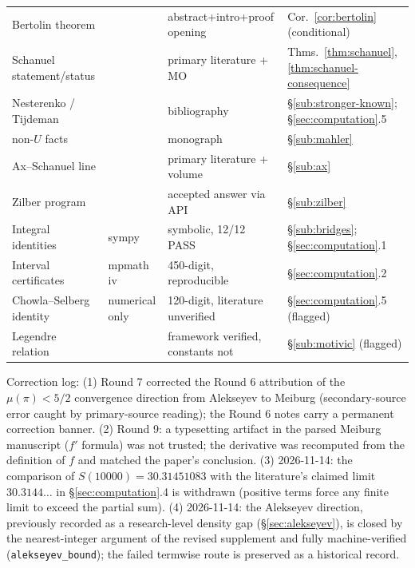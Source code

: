 \documentclass[11pt]{amsart}
\theoremstyle{definition}
\theoremstyle{remark}
\numberwithin{equation}{section}
\newcommand{\irr}{\mu}
\begin{document}
\begin{center}
\begin{tabularx}{\textwidth}{@{}p{}p{}p{}X@{}}
Bertolin theorem & \cite{Bertolin2026} & abstract+intro+proof opening & Cor.~\ref{cor:bertolin} (conditional) \\
Schanuel statement/status & \cite{Ax1971,Baker,MO33817} & primary literature + MO & Thms.~\ref{thm:schanuel},\ref{thm:schanuel-consequence} \\
Nesterenko / Tijdeman & \cite{Nesterenko1996,Tijdemann1971} & bibliography & \S\ref{sub:stronger-known}; \S\ref{sec:computation}.5 \\
non-$U$ facts & \cite{Baker} & monograph & \S\ref{sub:mahler} \\
Ax--Schanuel line & \cite{Ax1971,MPT2019,BakkerTsimerman2019,CambridgeFF} & primary literature + volume & \S\ref{sub:ax} \\
Zilber program & \cite{MO33817} & accepted answer via API & \S\ref{sub:zilber} \\
Integral identities & sympy & symbolic, 12/12 PASS & \S\ref{sub:bridges}; \S\ref{sec:computation}.1 \\
Interval certificates & mpmath iv & 450-digit, reproducible & \S\ref{sec:computation}.2 \\
Chowla--Selberg identity & numerical only & 120-digit, literature unverified & \S\ref{sec:computation}.5 (flagged) \\
Legendre relation & \cite{DLMF23} & framework verified, constants not & \S\ref{sub:motivic} (flagged) \\
\bottomrule
\end{tabularx}
\end{center}

Correction log: (1) Round 7 corrected the Round 6 attribution of the $\irr(\pi)<5/2$ convergence direction from Alekseyev to Meiburg (secondary-source error caught by primary-source reading); the Round 6 notes carry a permanent correction banner. (2) Round 9: a typesetting artifact in the parsed Meiburg manuscript ($f'$ formula) was not trusted; the derivative was recomputed from the definition of $f$ and matched the paper's conclusion. (3) 2026-11-14: the comparison of $S(10000)=30.31451083$ with the literature's claimed limit $30.3144\dots$ in \S\ref{sec:computation}.4 is withdrawn (positive terms force any finite limit to exceed the partial sum). (4) 2026-11-14: the Alekseyev direction, previously recorded as a research-level density gap (\S\ref{sec:alekseyev}), is closed by the nearest-integer argument of the revised supplement and fully machine-verified (\texttt{alekseyev\_\allowbreak{}bound}); the failed termwise route is preserved as a historical record.
\end{document}
